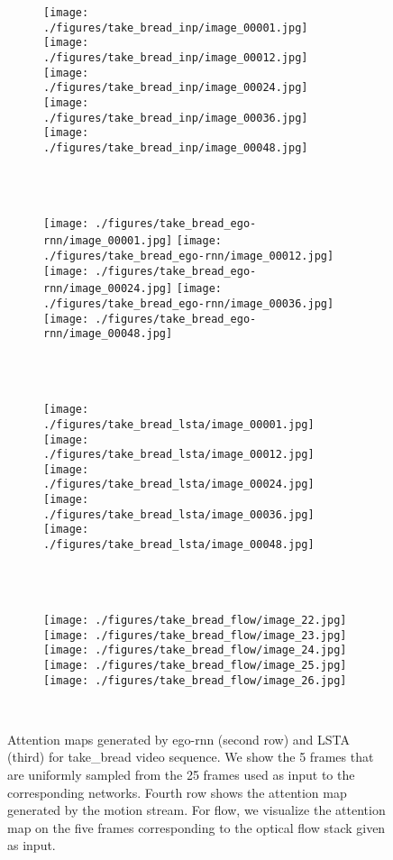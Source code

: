 \documentclass[10pt,twocolumn,letterpaper]{article}
\begin{document}
\begin{matrix*}[r]
\begin{figure*}[t]
	\centering      
	\begin{subfigure}[b]{0.95\textwidth}
		\texttt{[image: ./figures/take\_bread\_inp/image\_00001.jpg]}
		\texttt{[image: ./figures/take\_bread\_inp/image\_00012.jpg]}
		\texttt{[image: ./figures/take\_bread\_inp/image\_00024.jpg]}
		\texttt{[image: ./figures/take\_bread\_inp/image\_00036.jpg]}
		\texttt{[image: ./figures/take\_bread\_inp/image\_00048.jpg]}
	\end{subfigure}\\ \vskip 2mm
	\ 
	\begin{subfigure}[b]{0.95\textwidth}
		\texttt{[image: ./figures/take\_bread\_ego-rnn/image\_00001.jpg]}
		\texttt{[image: ./figures/take\_bread\_ego-rnn/image\_00012.jpg]}
		\texttt{[image: ./figures/take\_bread\_ego-rnn/image\_00024.jpg]}
		\texttt{[image: ./figures/take\_bread\_ego-rnn/image\_00036.jpg]}
		\texttt{[image: ./figures/take\_bread\_ego-rnn/image\_00048.jpg]}
	\end{subfigure}\\ \vskip 2mm
	\ 
	\begin{subfigure}[b]{0.95\textwidth}
		\texttt{[image: ./figures/take\_bread\_lsta/image\_00001.jpg]}
		\texttt{[image: ./figures/take\_bread\_lsta/image\_00012.jpg]}
		\texttt{[image: ./figures/take\_bread\_lsta/image\_00024.jpg]}
		\texttt{[image: ./figures/take\_bread\_lsta/image\_00036.jpg]}
		\texttt{[image: ./figures/take\_bread\_lsta/image\_00048.jpg]}
	\end{subfigure}\\ \vskip 2mm	       
	\ 
	\begin{subfigure}[b]{0.95\textwidth}
		\texttt{[image: ./figures/take\_bread\_flow/image\_22.jpg]}
		\texttt{[image: ./figures/take\_bread\_flow/image\_23.jpg]}
		\texttt{[image: ./figures/take\_bread\_flow/image\_24.jpg]}
		\texttt{[image: ./figures/take\_bread\_flow/image\_25.jpg]}
		\texttt{[image: ./figures/take\_bread\_flow/image\_26.jpg]}
	\end{subfigure}\\ \vskip 2mm			 
	\caption{Attention maps generated by ego-rnn (second row) and LSTA (third) for take\_bread video sequence. We show the 5 frames that are uniformly sampled from the 25 frames used as input to the corresponding networks. Fourth row shows the attention map generated by the motion stream. For flow, we visualize the attention map on the five frames corresponding to the optical flow stack given as input.}
	\label{fig:att_map_take_bread}
\end{figure*}


\end{matrix*}
\end{document}
